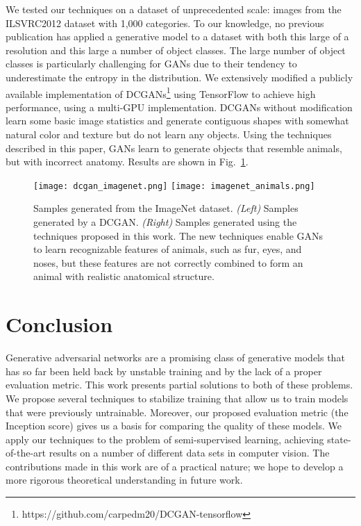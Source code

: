 \documentclass{article} \usepackage{nips14submit_e,times}
\newcommand{\fig}[1]{Fig.~\ref{fig:#1}}
\begin{document}
We tested our techniques on a dataset of unprecedented scale:  images from the ILSVRC2012
dataset with 1,000 categories.
To our knowledge, no previous publication has applied a generative model to a dataset with both this
large of a resolution and this large a number of object classes.
The large number of object classes is particularly challenging for GANs due to their tendency to underestimate
the entropy in the distribution.
We extensively modified a publicly available implementation of DCGANs\footnote{https://github.com/carpedm20/DCGAN-tensorflow}
using TensorFlow \cite{tensorflow} to achieve high performance, using a multi-GPU implementation.
DCGANs without modification learn some basic image statistics and generate contiguous shapes
with somewhat natural color and texture but do not learn any objects.
Using the techniques described in this paper, GANs learn to generate objects
that resemble animals, but with incorrect anatomy.
Results are shown in \fig{imagenet}.

\begin{figure}[htb]
	\centering
	\texttt{[image: dcgan\_imagenet.png]}
  \hfill
	\texttt{[image: imagenet\_animals.png]}
	\caption{Samples generated from the ImageNet dataset.
  {\em (Left)} Samples generated by a DCGAN.
  {\em (Right)} Samples generated using the techniques proposed in this work.
The new techniques enable GANs to learn recognizable features of animals,
such as fur, eyes, and noses, but these features are not correctly combined
to form an animal with realistic anatomical structure.
  }
\label{fig:imagenet}
\end{figure}

\section{Conclusion}
Generative adversarial networks are a promising class of generative models that has so far been held back by unstable training and by the lack of a proper evaluation metric. This work presents partial solutions to both of these problems. We propose several techniques to stabilize training that allow us to train models that were previously untrainable. Moreover, our proposed evaluation metric (the Inception score) gives us a basis for comparing the quality of these models. We apply our techniques to the problem of semi-supervised learning, achieving state-of-the-art results on a number of different data sets in computer vision. The contributions made in this work are of a practical nature; we hope to develop a more rigorous theoretical understanding in future work.

\small


\end{document}
